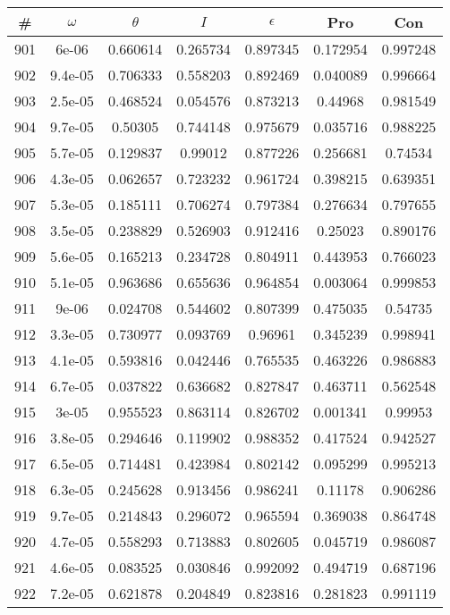 \newpage
\begin{table}
\begin{tabular}{c|c|c|c|c|c|c}
\# & $\omega$ & $\theta$ & $I$ & $\epsilon$ & Pro & Con\\
\hline
901 & 6e-06 & 0.660614 & 0.265734 & 0.897345 & 0.172954 & 0.997248\\
902 & 9.4e-05 & 0.706333 & 0.558203 & 0.892469 & 0.040089 & 0.996664\\
903 & 2.5e-05 & 0.468524 & 0.054576 & 0.873213 & 0.44968 & 0.981549\\
904 & 9.7e-05 & 0.50305 & 0.744148 & 0.975679 & 0.035716 & 0.988225\\
905 & 5.7e-05 & 0.129837 & 0.99012 & 0.877226 & 0.256681 & 0.74534\\
906 & 4.3e-05 & 0.062657 & 0.723232 & 0.961724 & 0.398215 & 0.639351\\
907 & 5.3e-05 & 0.185111 & 0.706274 & 0.797384 & 0.276634 & 0.797655\\
908 & 3.5e-05 & 0.238829 & 0.526903 & 0.912416 & 0.25023 & 0.890176\\
909 & 5.6e-05 & 0.165213 & 0.234728 & 0.804911 & 0.443953 & 0.766023\\
910 & 5.1e-05 & 0.963686 & 0.655636 & 0.964854 & 0.003064 & 0.999853\\
911 & 9e-06 & 0.024708 & 0.544602 & 0.807399 & 0.475035 & 0.54735\\
912 & 3.3e-05 & 0.730977 & 0.093769 & 0.96961 & 0.345239 & 0.998941\\
913 & 4.1e-05 & 0.593816 & 0.042446 & 0.765535 & 0.463226 & 0.986883\\
914 & 6.7e-05 & 0.037822 & 0.636682 & 0.827847 & 0.463711 & 0.562548\\
915 & 3e-05 & 0.955523 & 0.863114 & 0.826702 & 0.001341 & 0.99953\\
916 & 3.8e-05 & 0.294646 & 0.119902 & 0.988352 & 0.417524 & 0.942527\\
917 & 6.5e-05 & 0.714481 & 0.423984 & 0.802142 & 0.095299 & 0.995213\\
918 & 6.3e-05 & 0.245628 & 0.913456 & 0.986241 & 0.11178 & 0.906286\\
919 & 9.7e-05 & 0.214843 & 0.296072 & 0.965594 & 0.369038 & 0.864748\\
920 & 4.7e-05 & 0.558293 & 0.713883 & 0.802605 & 0.045719 & 0.986087\\
921 & 4.6e-05 & 0.083525 & 0.030846 & 0.992092 & 0.494719 & 0.687196\\
922 & 7.2e-05 & 0.621878 & 0.204849 & 0.823816 & 0.281823 & 0.991119\\

\end{tabular}
\end{table}
